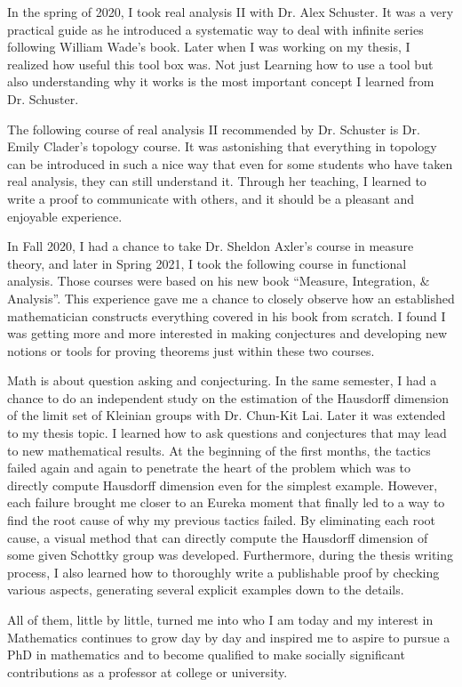 \documentclass[11pt]{amsart}
\begin{document}
In the spring of 2020, I took real analysis II with Dr. Alex Schuster. It was a very practical guide as he introduced a systematic way to deal with infinite series following William Wade's book. Later when I was working on my thesis, I realized how useful this tool box was. Not just Learning how to use a tool but also understanding why it works is the most important concept I learned from Dr. Schuster.

The following course of real analysis II recommended by Dr. Schuster is Dr. Emily Clader’s topology course. It was astonishing that everything in topology can be introduced in such a nice way that even for some students who have taken real analysis, they can still understand it. Through her teaching, I learned to write a proof to communicate with others, and it should be a pleasant and enjoyable experience.


In Fall 2020, I had a chance to take Dr. Sheldon Axler’s course in measure theory, and later in Spring 2021, I took the following course in functional analysis. Those courses were based on his new book ``Measure, Integration, $\&$ Analysis''.  This experience gave me a chance to closely observe how an established mathematician constructs everything covered in his book from scratch. I found I was getting more and more interested in making conjectures and developing new notions or tools for proving theorems just within these two courses.

Math is about question asking and conjecturing. In the same semester, I had a chance to do an independent study on the estimation of the Hausdorff dimension of the limit set of Kleinian groups with Dr. Chun-Kit Lai. Later it was extended to my thesis topic. I learned how to ask questions and conjectures that may lead to new mathematical results. At the beginning of the first months, the tactics failed again and again to penetrate the heart of the problem which was to directly compute Hausdorff dimension even for the simplest example. However, each failure brought me closer to an Eureka moment that finally led to a way to find the root cause of why my previous tactics failed. By eliminating each root cause, a visual method that can directly compute the Hausdorff dimension of some given Schottky group was developed. Furthermore, during the thesis writing process, I also learned how to thoroughly write a publishable proof by checking various aspects, generating several explicit examples down to the details.


All of them, little by little, turned me into who I am today and my interest in Mathematics continues to grow day by day and inspired me to aspire to pursue a PhD in mathematics and to become qualified to make socially significant contributions as a professor at college or university.
\end{document}
